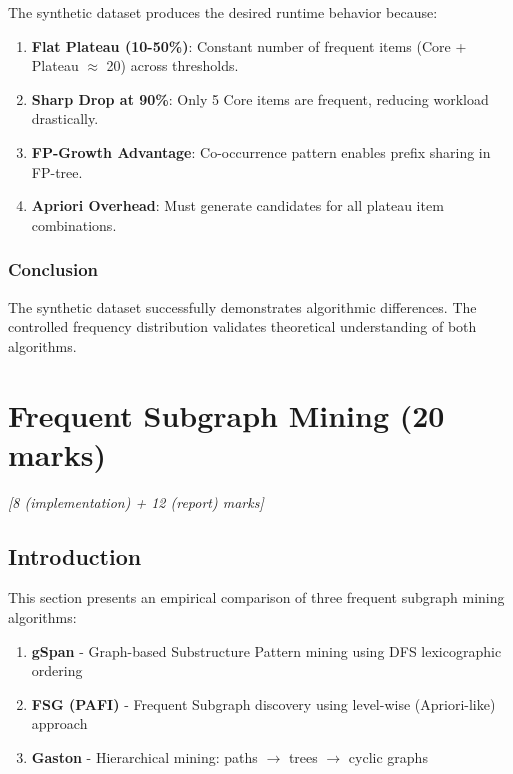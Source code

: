 \documentclass[11pt,a4paper]{article}
\begin{document}
The synthetic dataset produces the desired runtime behavior because:

\begin{enumerate}
    \item \textbf{Flat Plateau (10-50\%)}: Constant number of frequent items (Core + Plateau $\approx$ 20) across thresholds.
    \item \textbf{Sharp Drop at 90\%}: Only 5 Core items are frequent, reducing workload drastically.
    \item \textbf{FP-Growth Advantage}: Co-occurrence pattern enables prefix sharing in FP-tree.
    \item \textbf{Apriori Overhead}: Must generate candidates for all plateau item combinations.
\end{enumerate}

\subsubsection{Conclusion}

The synthetic dataset successfully demonstrates algorithmic differences. The controlled frequency distribution validates theoretical understanding of both algorithms.

\newpage
\section{Frequent Subgraph Mining (20 marks)}
\textit{[8 (implementation) + 12 (report) marks]}

\subsection{Introduction}

This section presents an empirical comparison of three frequent subgraph mining algorithms:
\begin{enumerate}
    \item \textbf{gSpan} - Graph-based Substructure Pattern mining using DFS lexicographic ordering
    \item \textbf{FSG (PAFI)} - Frequent Subgraph discovery using level-wise (Apriori-like) approach
    \item \textbf{Gaston} - Hierarchical mining: paths $\rightarrow$ trees $\rightarrow$ cyclic graphs
\end{enumerate}
\end{document}
